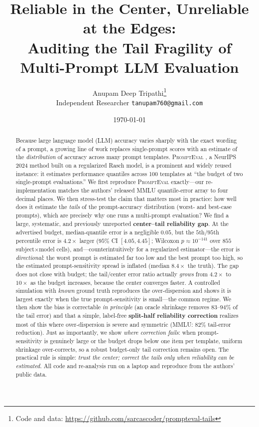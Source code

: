 \documentclass[11pt]{article}
\title{\bf Reliable in the Center, Unreliable at the Edges:\\
Auditing the Tail Fragility of Multi-Prompt LLM Evaluation}
\author{Anupam Deep Tripathi\thanks{Code and data: \url{https://github.com/sarcascoder/prompteval-tails}}\\
\small Independent Researcher \quad \texttt{tanupam760@gmail.com}}
\date{\today}
\newcommand{\pe}{\textsc{PromptEval}}
\begin{document}
\maketitle

\begin{abstract}
Because large language model (LLM) accuracy varies sharply with the exact wording of a
prompt, a growing line of work replaces single-prompt scores with an estimate of the
\emph{distribution} of accuracy across many prompt templates. \pe{}
\citep{polo2024prompteval}, a NeurIPS 2024 method built on a regularized Rasch model, is a
prominent and widely reused instance: it estimates performance quantiles across 100
templates at ``the budget of two single-prompt evaluations.'' We first reproduce \pe{}
exactly---our re-implementation matches the authors' released MMLU quantile-error array to
four decimal places. We then stress-test the claim that matters most in practice: how well
does it estimate the \emph{tails} of the prompt-accuracy distribution (worst- and best-case
prompts), which are precisely why one runs a multi-prompt evaluation? We find a large,
systematic, and previously unreported \textbf{center--tail reliability gap}. At the advertised
budget, median-quantile error is a negligible $0.05$, but the $5$th/$95$th percentile error is
$4.2\times$ larger ($95\%$ CI $[4.05,4.45]$; Wilcoxon $p\!\approx\!10^{-141}$ over $855$
subject$\times$model cells), and---counterintuitively for a regularized estimator---the
error is \emph{directional}: the worst prompt is estimated far too low and the best prompt too
high, so the estimated prompt-sensitivity spread is inflated (median $8.4\times$ the truth).
The gap does not close with budget; the tail/center error ratio actually \emph{grows} from
$4.2\times$ to $10\times$ as the budget increases, because the center converges faster. A
controlled simulation with \emph{known} ground truth reproduces the over-dispersion and shows
it is largest exactly when the true prompt-sensitivity is small---the common regime. We then
show the bias is correctable \emph{in principle} (an oracle shrinkage removes $83$--$94\%$ of
the tail error) and that a simple, label-free \textbf{split-half reliability correction}
realizes most of this where over-dispersion is severe and symmetric (MMLU: $82\%$ tail-error
reduction). Just as importantly, we show \emph{where correction fails}: when prompt-sensitivity
is genuinely large or the budget drops below one item per template, uniform shrinkage
over-corrects, so a robust budget-only tail correction remains open. The practical rule is
simple: \emph{trust the center; correct the tails only when reliability can be estimated}. All
code and re-analysis run on a laptop and reproduce from the authors' public data.
\end{abstract}
\end{document}
